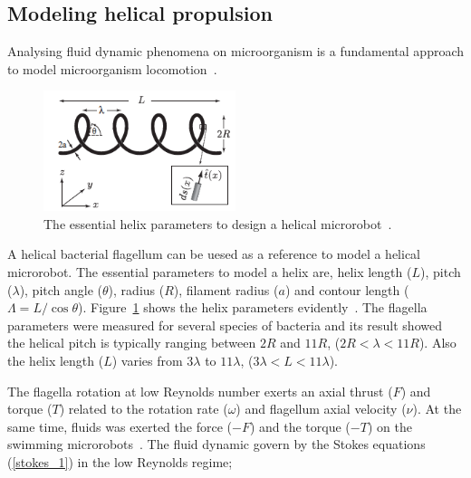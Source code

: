 \documentclass[12pt,a4paper,titlepage]{report}
\begin{document}


\subsection{Modeling helical propulsion}\label{maths}

Analysing fluid dynamic phenomena on microorganism is a fundamental approach to model
 microorganism
 locomotion~\citep{smith2009boundary}.


\begin{figure}
  \begin{center}
    \includegraphics[width=0.5\textwidth]{parameters}
  \caption{The essential helix parameters to design a helical microrobot~\citep{rodenborn2013propulsion}.}
  \label{parameters}
\end{center}
\end{figure}

A helical bacterial flagellum can be uesed as a reference to model a helical microrobot. The 
essential parameters to model a helix are, helix length ($L$), pitch ($\lambda$), pitch angle ($\theta$), 
radius ($R$), filament radius ($a$) and contour length ($\Lambda = L/ \cos \theta$). Figure~\ref{parameters} shows
the helix parameters evidently~\citep{rodenborn2013propulsion}. The flagella parameters were measured for
 several species of bacteria and its result showed the helical pitch is typically ranging between $2R$ and
$11R$, ($2R < \lambda < 11R$). Also the helix length ($L$) varies from $3\lambda$ to $11\lambda$, 
($3\lambda < L < 11\lambda$).






The flagella rotation at low Reynolds number exerts an axial thrust ($F$) and torque ($T$) related to the
rotation rate ($\omega$) and flagellum axial velocity ($\nu$). At the same time, fluids was exerted the force
 ($-F$) and the torque ($-T$) on the swimming microrobots~\citep{purcell1997efficiency}. The fluid dynamic 
govern by the Stokes equations (\ref{stokes_1}) in the low Reynolds regime;
\end{document}

